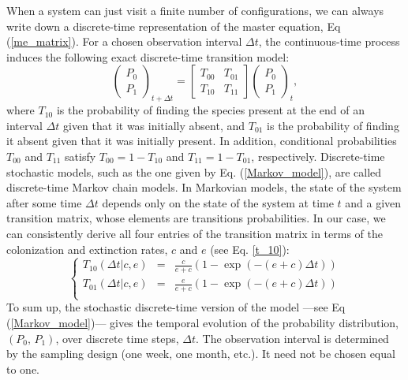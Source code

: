 When a system can just visit a finite number of configurations, we can always write down a discrete-time representation of the master equation, Eq (\ref{me_matrix}). For a chosen observation interval $\Delta t$, the continuous-time process induces the following exact discrete-time transition model:
\begin{equation}
\label{Markov_model}
\left(
\begin{array}{c}
P_0 \\ 
P_1
\end{array}
\right)_{t+\Delta t} = \left[\begin{array}{cc}
T_{00} & T_{01} \\
T_{10} & T_{11}
\end{array} 
\right]
\left(
\begin{array}{c}
P_0 \\ 
P_1 
\end{array}
\right)_{t},
\end{equation}
where $T_{10}$ is the probability of finding the species present at the end of an interval $\Delta t$ given that it was initially absent, and $T_{01}$ is the probability of finding it absent given that it was initially present. In addition, conditional probabilities $T_{00}$ and $T_{11}$ satisfy $T_{00}=1-T_{10}$ and $T_{11}=1-T_{01}$, respectively. Discrete-time stochastic models, such as the one given by Eq. (\ref{Markov_model}), are called discrete-time Markov chain models. In Markovian models, the state of the system after some time $\Delta t$ depends only on the state of the system at time $t$ and a given transition matrix, whose elements are transitions probabilities. In our case, we can consistently derive all four entries of the transition matrix in terms of the colonization and extinction rates, $c$ and $e$ (see Eq. \eqref{t_10}):
\begin{equation}
\label{T_00}
\left\{
\begin{array}{ccc}      
T_{10}(\Delta t| c, e) &=&  \frac{c}{e+c} ( 1 - \exp(-(e+c)\Delta t) )\\  
T_{01}(\Delta t| c, e) &=&  \frac{e}{e+c} ( 1 - \exp(-(e+c)\Delta t) )\\
\end{array}
\right.
\end{equation} 
To sum up, the stochastic discrete-time version of the model ---see Eq (\ref{Markov_model})--- gives the temporal evolution of the probability distribution, $(P_0,\, P_1)$, over discrete time steps, $\Delta t$. The observation interval is determined by the sampling design (one week, one month, etc.). It need not be chosen equal to one. 
\bigskip

